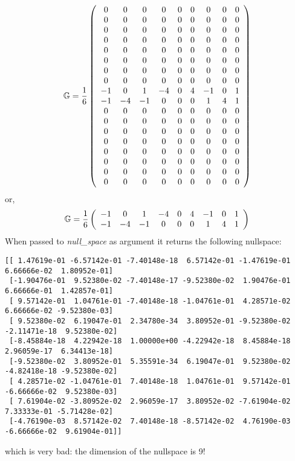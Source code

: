 \[
{\mathbb{G}}=
\frac{1}{6}
\left(
\begin{array}{ccccccccc}
  0  &   0 &   0 &   0 &   0 &    0 &   0 &   0 &   0 \\ 
  0  &   0 &   0 &   0 &   0 &    0 &   0 &   0 &   0 \\ 
  0  &   0 &   0 &   0 &   0 &    0 &   0 &   0 &   0 \\ 
  0  &   0 &   0 &   0 &   0 &    0 &   0 &   0 &   0 \\ 
  0  &   0 &   0 &   0 &   0 &    0 &   0 &   0 &   0 \\ 
  0  &   0 &   0 &   0 &   0 &    0 &   0 &   0 &   0 \\ 
  0  &   0 &   0 &   0 &   0 &    0 &   0 &   0 &   0 \\ 
  0  &   0 &   0 &   0 &   0 &    0 &   0 &   0 &   0 \\ 
 -1  &   0 &   1 &  -4 &   0 &    4 &  -1 &   0 &   1 \\ 
 -1  &  -4 &  -1 &   0 &   0 &    0 &   1 &   4 &   1 \\ 
  0  &   0 &   0 &   0 &   0 &    0 &   0 &   0 &   0 \\ 
  0  &   0 &   0 &   0 &   0 &    0 &   0 &   0 &   0 \\ 
  0  &   0 &   0 &   0 &   0 &    0 &   0 &   0 &   0 \\ 
  0  &   0 &   0 &   0 &   0 &    0 &   0 &   0 &   0 \\ 
  0  &   0 &   0 &   0 &   0 &    0 &   0 &   0 &   0 \\ 
  0  &   0 &   0 &   0 &   0 &    0 &   0 &   0 &   0 \\ 
  0  &   0 &   0 &   0 &   0 &    0 &   0 &   0 &   0 \\ 
  0  &   0 &   0 &   0 &   0 &    0 &   0 &   0 &   0 
\end{array}
\right)
\]
or, 
\[
{\mathbb{G}}=
\frac{1}{6}
\left(
\begin{array}{ccccccccc}
 -1  &   0 &   1 &  -4 &   0 &    4 &  -1 &   0 &   1 \\ 
 -1  &  -4 &  -1 &   0 &   0 &    0 &   1 &   4 &   1 
\end{array}
\right)
\]
When passed to {\sl null\_space} as argument it returns the following nullspace:
\begin{verbatim}
[[ 1.47619e-01 -6.57142e-01 -7.40148e-18  6.57142e-01 -1.47619e-01  6.66666e-02  1.80952e-01]
 [-1.90476e-01  9.52380e-02 -7.40148e-17 -9.52380e-02  1.90476e-01  6.66666e-01  1.42857e-01]
 [ 9.57142e-01  1.04761e-01 -7.40148e-18 -1.04761e-01  4.28571e-02  6.66666e-02 -9.52380e-03]
 [ 9.52380e-02  6.19047e-01  2.34780e-34  3.80952e-01 -9.52380e-02 -2.11471e-18  9.52380e-02]
 [-8.45884e-18  4.22942e-18  1.00000e+00 -4.22942e-18  8.45884e-18  2.96059e-17  6.34413e-18]
 [-9.52380e-02  3.80952e-01  5.35591e-34  6.19047e-01  9.52380e-02 -4.82418e-18 -9.52380e-02]
 [ 4.28571e-02 -1.04761e-01  7.40148e-18  1.04761e-01  9.57142e-01 -6.66666e-02  9.52380e-03]
 [ 7.61904e-02 -3.80952e-02  2.96059e-17  3.80952e-02 -7.61904e-02  7.33333e-01 -5.71428e-02]
 [-4.76190e-03  8.57142e-02  7.40148e-18 -8.57142e-02  4.76190e-03 -6.66666e-02  9.61904e-01]]
\end{verbatim}
which is very bad: the dimension of the nullspace is 9!

